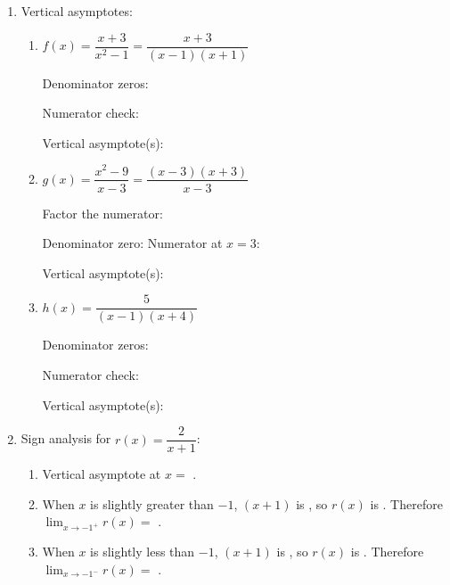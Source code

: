 \documentclass[10pt]{article}
\begin{document}
\namedateperiod

\vspace{0.12in}

\begin{enumerate}[itemsep=14pt]

\item Vertical asymptotes:

\begin{enumerate}[label=(\alph*), itemsep=10pt]
  \item $f(x) = \dfrac{x + 3}{x^2 - 1} = \dfrac{x+3}{(x-1)(x+1)}$

        Denominator zeros: 

        Numerator check: 

        Vertical asymptote(s): 

  \item $g(x) = \dfrac{x^2 - 9}{x - 3} = \dfrac{(x-3)(x+3)}{x-3}$

        Factor the numerator: 

        Denominator zero:  \quad Numerator at $x=3$: 

        Vertical asymptote(s): 

  \item $h(x) = \dfrac{5}{(x - 1)(x + 4)}$

        Denominator zeros: 

        Numerator check: 

        Vertical asymptote(s): 
\end{enumerate}

\item Sign analysis for $r(x) = \dfrac{2}{x + 1}$:

\begin{enumerate}[label=(\alph*), itemsep=6pt]
  \item Vertical asymptote at $x =$ .

  \item When $x$ is slightly greater than $-1$, $(x+1)$ is ,
        so $r(x)$ is .
        Therefore $\displaystyle\lim_{x \to -1^+} r(x) =$ \ans{$+\infty$}.

  \item When $x$ is slightly less than $-1$, $(x+1)$ is ,
        so $r(x)$ is .
        Therefore $\displaystyle\lim_{x \to -1^-} r(x) =$ \ans{$-\infty$}.
\end{enumerate}


\end{enumerate}
\end{document}

